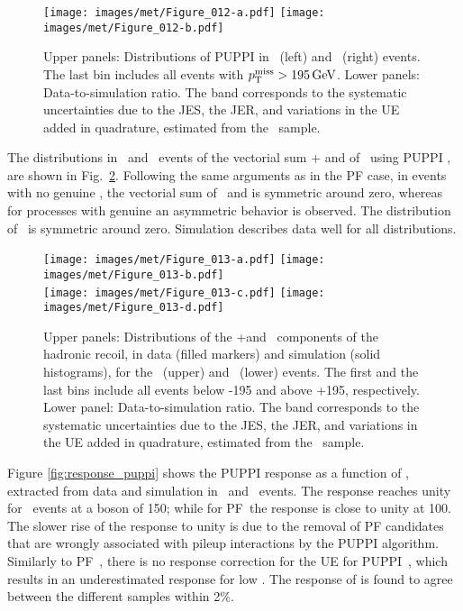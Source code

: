 \begin{figure}[!htp]
  \centering
  \texttt{[image: images/met/Figure\_012-a.pdf]}
  \texttt{[image: images/met/Figure\_012-b.pdf]}
  \caption{Upper panels: Distributions of PUPPI \ptmiss in \Zmm\ (left) and \Zee\ (right) events. The last bin includes all events with $p_{\mathrm{T}}^\text{miss}>195\,\text{Ge\hspace{-.08em}V}$.
Lower panels: Data-to-simulation ratio. The band corresponds to the systematic uncertainties due to the JES, the JER, and variations in the UE added in quadrature, estimated from the \Zee\ sample.}
  \label{fig:puppimet}
\end{figure}

The distributions in \Zmm\ and \Zee\ events of the vectorial sum \upar + \qt and of \uperp\, using PUPPI \ptmiss,  are shown in Fig.~\ref{fig:uparuperp_puppi}. 
Following the same arguments as in the PF \ptmiss case, in events with no genuine \ptmiss, the vectorial sum of \upar\ and \qt is symmetric around zero, whereas for processes with genuine \ptmiss an asymmetric behavior is observed. 
The distribution of \uperp\ is symmetric around zero. Simulation describes data well for all distributions.

\begin{figure}[!htp]
  \centering
  \texttt{[image: images/met/Figure\_013-a.pdf]}
  \texttt{[image: images/met/Figure\_013-b.pdf]}\\
  \texttt{[image: images/met/Figure\_013-c.pdf]}
  \texttt{[image: images/met/Figure\_013-d.pdf]}
  \caption{Upper panels: Distributions of the \upar+\qt and \uperp\ components of the hadronic recoil, in data (filled markers) and simulation (solid histograms), for the \Zmm\ (upper) and \Zee\ (lower) events. The first and the last bins include all events below -195 and above +195, respectively.
Lower panel: Data-to-simulation ratio. The band corresponds to the systematic uncertainties due to the JES, the JER, and variations in the UE added in quadrature, estimated from the \Zee\ sample.}
  \label{fig:uparuperp_puppi}
\end{figure}

Figure \ref{fig:response_puppi} shows the PUPPI \ptmiss response as a function of \qt, extracted from data and simulation in \Zmm\ and \Zee\ events. 
The response reaches unity for \Zmm\ events at a boson \pt of 150\GeV; while for PF~\ptmiss the response is close to unity at 100\GeV. 
The slower rise of the response to unity is due to the removal of PF candidates that are wrongly associated with pileup interactions by the PUPPI algorithm. 
Similarly to PF~\ptmiss, there is no response correction for the UE for PUPPI~\ptmiss, which results in an underestimated response for low \qt. 
The response of \ptmiss is found to agree between the different samples  within 2\%. 

